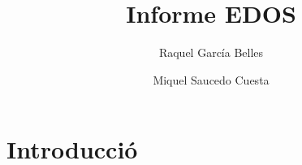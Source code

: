 \documentclass[11pt,a4paper]{article}
\author{}
\title{Informe EDOS}
\author{Raquel García Belles \and Miquel Saucedo Cuesta}
\date{}
\begin{document}
	\maketitle
	\section{Introducció}
\end{document}
